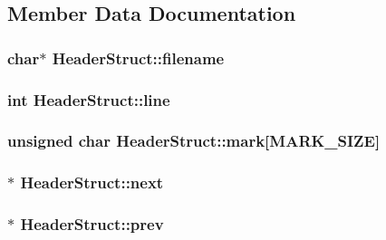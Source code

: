 \subsection{Member Data Documentation}
\hypertarget{struct_header_struct_ac66081945a967351e1c465cf9fc1ad0e}{}
\subsubsection[{filename}]{\setlength{\rightskip}{0pt plus 5cm}char$\ast$ Header\+Struct\+::filename}\label{struct_header_struct_ac66081945a967351e1c465cf9fc1ad0e}
\hypertarget{struct_header_struct_a598de0f5ec396866b1d534806ac93fb5}{}
\subsubsection[{line}]{\setlength{\rightskip}{0pt plus 5cm}int Header\+Struct\+::line}\label{struct_header_struct_a598de0f5ec396866b1d534806ac93fb5}
\hypertarget{struct_header_struct_aa7ff45e1bfc66ff72d9ffc41e4021447}{}
\subsubsection[{mark}]{\setlength{\rightskip}{0pt plus 5cm}unsigned char Header\+Struct\+::mark\mbox{[}{\bf M\+A\+R\+K\+\_\+\+S\+I\+Z\+E}\mbox{]}}\label{struct_header_struct_aa7ff45e1bfc66ff72d9ffc41e4021447}
\hypertarget{struct_header_struct_adb09b99f377a7c151915ddd4b63eb2ae}{}
\subsubsection[{next}]{$\ast$ Header\+Struct\+::next}\label{struct_header_struct_adb09b99f377a7c151915ddd4b63eb2ae}
\hypertarget{struct_header_struct_a3071c07de335b54aaa6151adb871f8bf}{}
\subsubsection[{prev}]{$\ast$ Header\+Struct\+::prev}\label{struct_header_struct_a3071c07de335b54aaa6151adb871f8bf}
\hypertarget{struct_header_struct_ad6b63ca7e387b292da71cf12e41b56ca}{}

